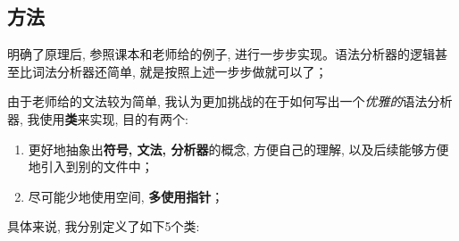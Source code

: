 \documentclass{zpt}
\begin{document}
    \subsection{方法}
    明确了原理后, 参照课本和老师给的例子, 进行一步步实现。语法分析器的逻辑甚至比词法分析器还简单, 就是按照上述一步步做就可以了；\par
    由于老师给的文法较为简单, 我认为更加挑战的在于如何写出一个\emph{优雅的}语法分析器, 我使用\textbf{类}来实现, 目的有两个:\begin{enumerate}
        \item 更好地抽象出\textbf{符号, 文法, 分析器}的概念, 方便自己的理解, 以及后续能够方便地引入到别的文件中；
        \item 尽可能少地使用空间, \textbf{多使用指针}；
    \end{enumerate}
    具体来说, 我分别定义了如下5个类:
\end{document}

